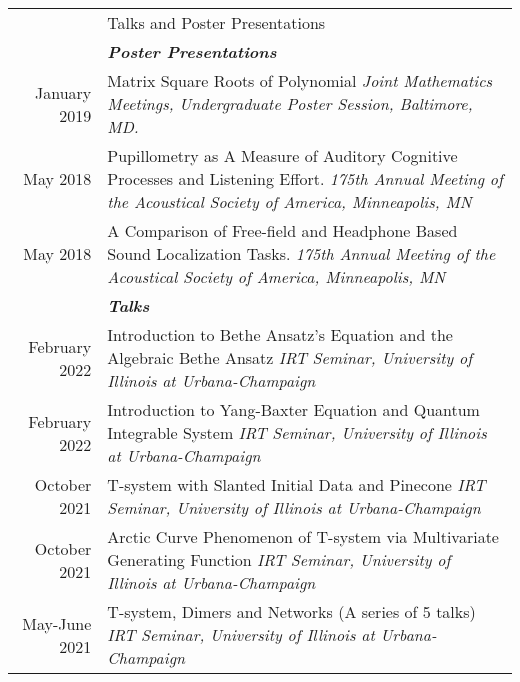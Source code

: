 \documentclass[letterpaper, 11pt]{article}
\newcommand{\headingfont}{\Large\color{Red}}
\newenvironment{SectionTable}[1]{
	\renewcommand*{\arraystretch}{1.7}
	\setlength{\tabcolsep}{10pt}
	\begin{longtable}{Rp{5.2in}} & #1 \\}
	{\end{longtable}\vspace{-.3cm}}
\begin{document}
	
	\begin{SectionTable}{\headingfont Talks and Poster Presentations}
		& \textit{\textbf{Poster Presentations}}\\
		
		January 2019 &
		Matrix Square Roots of Polynomial \newline
		\textit{Joint Mathematics Meetings, Undergraduate Poster Session, Baltimore, MD.} \\
		
		May 2018 &
		Pupillometry as A Measure of Auditory Cognitive Processes and Listening Effort. \newline
		\textit{175th Annual Meeting of the Acoustical Society of America, Minneapolis, MN} \\
		
		May 2018 &
		A Comparison of Free-field and Headphone Based Sound Localization Tasks. \newline
		\textit{175th Annual Meeting of the Acoustical Society of America, Minneapolis, MN} \\
		
		& \textit{\textbf{Talks}}\\
		February 2022 &
		Introduction to Bethe Ansatz's Equation and the Algebraic Bethe Ansatz\newline
		\textit{IRT Seminar, University of Illinois at Urbana-Champaign} \\

		February 2022 &
		Introduction to Yang-Baxter Equation and Quantum Integrable System\newline
		\textit{IRT Seminar, University of Illinois at Urbana-Champaign} \\
		
		October 2021 &
		T-system with Slanted Initial Data and Pinecone \newline
		\textit{IRT Seminar, University of Illinois at Urbana-Champaign} \\
		

		October 2021 &
		Arctic Curve Phenomenon of T-system via Multivariate Generating Function\newline
		\textit{IRT Seminar, University of Illinois at Urbana-Champaign} \\
		
		May-June 2021 &
		T-system, Dimers and Networks (A series of 5 talks) \newline
		\textit{IRT Seminar, University of Illinois at Urbana-Champaign} \\
		


\end{SectionTable}
\end{document}
